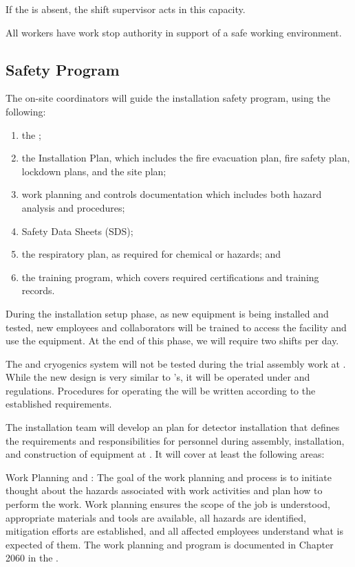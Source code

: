 If the  is absent, the shift supervisor acts in this capacity.

All workers have work stop authority in support of a safe working environment. 

\subsection{Safety Program}

The on-site  coordinators will guide the  installation safety program, using the following:

\begin{enumerate}
\item	the ;
\item the  Installation  Plan, which includes the fire evacuation plan, fire safety plan, lockdown plans, and the site plan;
\item	work planning and controls documentation which includes both hazard analysis and procedures; 
\item	Safety Data Sheets (SDS); 
\item	the respiratory plan, as required for chemical or  hazards; and 
\item	the training program, which covers required certifications and  training records.
\end{enumerate}


During the installation setup phase, as new equipment is being installed and tested, new employees and collaborators will be trained to access the facility and use the equipment. At the end of this phase, we will require two shifts per day.


The \coldbox and cryogenics system will not be 
tested during the trial assembly work at . 
While the new \coldbox design is very similar to 's, it will be operated under  and  regulations.  Procedures for operating the \coldbox will be written according to the established requirements.

The  installation team
 will develop an   plan for detector  installation that defines  
the  requirements and responsibilities for personnel during  assembly, installation, and construction of equipment at . It will cover at least the following areas:

{Work Planning and :} The goal of the work planning and  process is to initiate thought about the hazards associated with work activities and plan how to perform the work. Work planning ensures the scope of the job is understood, appropriate materials and tools are available, all hazards are identified, mitigation efforts are established, and all affected employees understand what is expected of them. 
The work planning and  program is documented in Chapter 2060 in the .

